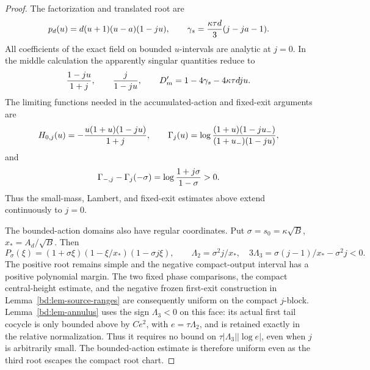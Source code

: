 \begin{proof}
The factorization and translated root are
\begin{equation}
 p_d(u)=d(u+1)(u-a)(1-ju),\qquad
 \gamma_s={\kappa\tau d\over3}(j-ja-1).
 \label{deg:degree-infinity-factor}
\end{equation}
All coefficients of the exact field on bounded \(u\)-intervals are
analytic at \(j=0\).  In the middle calculation the apparently singular
quantities reduce to
\[
 {1-ju\over1+j},\qquad {j\over1-ju},\qquad
 D_m'=1-4\gamma_s-4\kappa\tau dju.
\]
The limiting functions needed in the accumulated-action and fixed-exit
arguments are
\[
 H_{0,j}(u)=-{u(1+u)(1-ju)\over1+j},\qquad
 \Gamma_j(u)=
 \log{(1+u)(1-ju_-)\over(1+u_-)(1-ju)},
\]
and
\[
 \Gamma_{-,j}-\Gamma_j(-\sigma)
 =\log{1+j\sigma\over1-\sigma}>0.
\]
Thus the small-mass, Lambert, and fixed-exit estimates above extend
continuously to \(j=0\).

The bounded-action domains also have regular coordinates.  Put
\(\sigma=s_0=\kappa\sqrt B\), \(x_*=A_d/\sqrt B\).  Then
\[
 P_\sigma(\xi)=(1+\sigma\xi)(1-\xi/x_*)(1-\sigma j\xi),\qquad
 \Lambda_2=\sigma^2j/x_*,\quad
 3\Lambda_3=\sigma(j-1)/x_*-\sigma^2j<0.
\]
The positive root remains simple and the negative compact-output
interval has a positive polynomial margin.  The two fixed phase
comparisons, the compact central-height estimate, and the negative
frozen first-exit construction in
Lemma~\ref{bd:lem-source-ranges} are consequently uniform on the
compact \(j\)-block.  Lemma~\ref{bd:lem-annulus} uses the sign
\(\Lambda_3<0\) on this face: its actual first tail cocycle is only
bounded above by \(Ce^2\), with \(e=\tau\Lambda_2\), and is
retained exactly in the relative normalization.  Thus it requires
no bound on \(\tau|\Lambda_3||\log e|\), even when \(j\) is
arbitrarily small.  The bounded-action estimate is therefore uniform even as the third root
escapes the compact root chart.


\end{proof}
